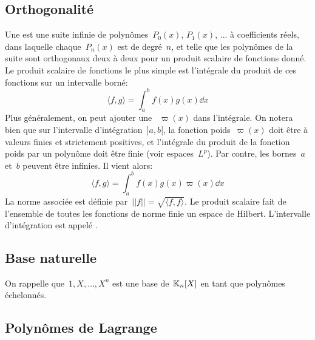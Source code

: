 \medskip
\subsection{Orthogonalité} 

Une  est une suite infinie de polynômes~$P_0(x)$, $P_1(x)$, ... à coefficients réels, dans laquelle chaque~$P_n(x)$ est de degré~$n$, et telle que les polynômes de la suite sont orthogonaux deux à deux pour un produit scalaire de fonctions donné. Le produit scalaire de fonctions le plus simple est l'intégrale du produit de ces fonctions sur un intervalle borné: 
\begin{equation}
\langle f,g \rangle=\int_a^b f(x)g(x)\dd x 
\end{equation}
Plus généralement, on peut ajouter une ~$\varpi(x)$ dans l'intégrale. On notera bien que sur l'intervalle d'intégration~$]a,b[$, la fonction poids~$\varpi(x)$ doit être à valeurs finies et strictement positives, et l'intégrale du produit de la fonction poids par un polynôme doit être finie (voir espaces~$L^p$). Par contre, les bornes~$a$ et~$b$ peuvent être infinies. Il vient alors: 
\begin{equation}
 \langle f,g \rangle=\int_a^b f(x)g(x)\varpi(x)\dd x 
\end{equation}
La norme associée est définie par~$||f||=\sqrt{\langle f,f \rangle}$. Le produit scalaire fait de l'ensemble de toutes les fonctions de norme finie un espace de Hilbert. L'intervalle d'intégration est appelé . 

\medskip
\subsection{Base naturelle} 

On rappelle que~$1,X,\ldots,X^n$ est une base de~$\mathbb K_n[X]$ en tant que polynômes échelonnés. 

\medskip
\subsection{Polynômes de Lagrange} 

